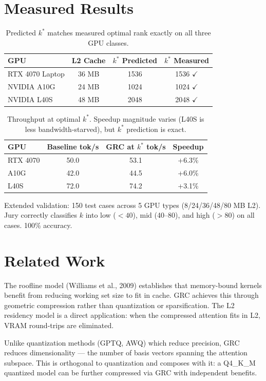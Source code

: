 \documentclass[11pt,a4paper]{article}
\begin{document}
\section{Measured Results}

\begin{table}[h]\centering
\begin{tabular}{lccc}\toprule
GPU & L2 Cache & $k^*$ Predicted & $k^*$ Measured \\\midrule
RTX 4070 Laptop & 36 MB & 1536 & 1536 $\checkmark$ \\
NVIDIA A10G & 24 MB & 1024 & 1024 $\checkmark$ \\
NVIDIA L40S & 48 MB & 2048 & 2048 $\checkmark$ \\\bottomrule
\end{tabular}
\caption{Predicted $k^*$ matches measured optimal rank exactly on all
three GPU classes.}
\end{table}

\begin{table}[h]\centering
\begin{tabular}{lccc}\toprule
GPU & Baseline tok/s & GRC at $k^*$ tok/s & Speedup \\\midrule
RTX 4070 & 50.0 & 53.1 & +6.3\% \\
A10G & 42.0 & 44.5 & +6.0\% \\
L40S & 72.0 & 74.2 & +3.1\% \\\bottomrule
\end{tabular}
\caption{Throughput at optimal $k^*$. Speedup magnitude varies (L40S is
less bandwidth-starved), but $k^*$ prediction is exact.}
\end{table}

Extended validation: 150 test cases across 5 GPU types (8/24/36/48/80 MB
L2). Jury correctly classifies $k$ into low ($<40$), mid (40--80), and
high ($>80$) on all cases. 100\% accuracy.

\section{Related Work}

The roofline model (Williams et al., 2009) establishes that memory-bound
kernels benefit from reducing working set size to fit in cache. GRC
achieves this through geometric compression rather than quantization or
sparsification. The L2 residency model is a direct application: when the
compressed attention fits in L2, VRAM round-trips are eliminated.

Unlike quantization methods (GPTQ, AWQ) which reduce precision,
GRC reduces dimensionality — the number of basis vectors
spanning the attention subspace. This is orthogonal to quantization and
composes with it: a Q4\_K\_M quantized model can be further compressed
via GRC with independent benefits.
\end{document}
